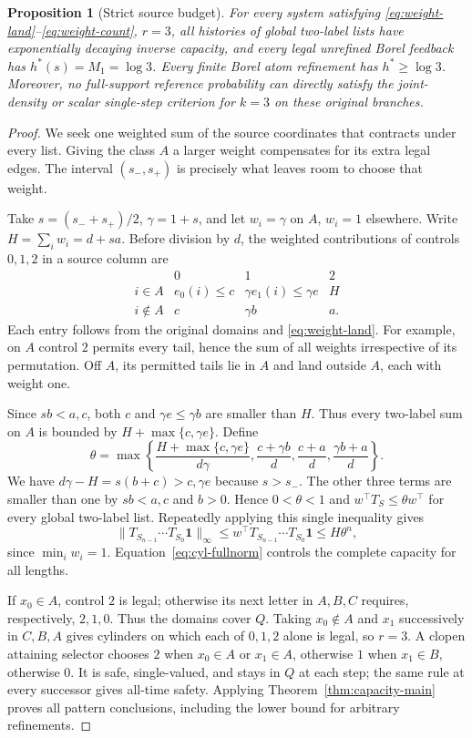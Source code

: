 \documentclass[11pt,reqno]{amsart}
\numberwithin{equation}{section}
\newtheorem{proposition}[theorem]{Proposition}
\theoremstyle{definition}
\theoremstyle{definition}
\newcommand{\one}{\mathbf 1}
\begin{document}
\begin{proposition}[Strict source budget]\label{thm:source-weight}
For every system satisfying \eqref{eq:weight-land}--\eqref{eq:weight-count},
$r=3$, all histories of global two-label lists have exponentially
decaying inverse capacity, and every legal unrefined Borel feedback
has $h^*(s)=M_1=\log3$. Every finite Borel atom refinement has
$h^*\ge\log3$. Moreover, no full-support reference probability
can directly satisfy the joint-density or scalar single-step
criterion for $k=3$ on these original branches.
\end{proposition}
\begin{proof}
We seek one weighted sum of the source coordinates that contracts
under every list. Giving the class $A$ a larger weight compensates
for its extra legal edges. The interval $(s_-,s_+)$ is precisely
what leaves room to choose that weight.

Take $s=(s_-+s_+)/2$, $\gamma=1+s$, and let $w_i=\gamma$
on $A$, $w_i=1$ elsewhere. Write $H=\sum_iw_i=d+sa$.
Before division by $d$, the weighted contributions of controls
$0,1,2$ in a source column are
\[
\begin{array}{c|ccc}
 &0&1&2\\\hline
 i\in A&e_0(i)\le c&\gamma e_1(i)\le\gamma e&H\\
 i\notin A&c&\gamma b&a.
\end{array}
\]
Each entry follows from the original domains and
\eqref{eq:weight-land}. For example, on $A$ control $2$ permits
every tail, hence the sum of all weights irrespective of its
permutation. Off $A$, its permitted tails lie in $A$ and land
outside $A$, each with weight one.

Since $sb<a,c$, both $c$ and $\gamma e\le\gamma b$ are smaller
than $H$. Thus every two-label sum on $A$ is bounded by
$H+\max\{c,\gamma e\}$. Define
\[
 \theta=\max\left\{
 \frac{H+\max\{c,\gamma e\}}{d\gamma},
 \frac{c+\gamma b}{d},\frac{c+a}{d},\frac{\gamma b+a}{d}
 \right\}.
\]
We have $d\gamma-H=s(b+c)>c,\gamma e$ because $s>s_-$.
The other three terms are smaller than one by $sb<a,c$ and
$b>0$. Hence $0<\theta<1$ and
$w^\top T_S\le\theta w^\top$ for every global two-label list.
Repeatedly applying this single inequality gives
\[
 \|T_{S_{n-1}}\cdots T_{S_0}\one\|_\infty
 \le w^\top T_{S_{n-1}}\cdots T_{S_0}\one
 \le H\theta^n,
\]
since $\min_iw_i=1$. Equation~\eqref{eq:cyl-fullnorm} controls
the complete capacity for all lengths.

If $x_0\in A$, control $2$ is legal; otherwise its next letter
in $A,B,C$ requires, respectively, $2,1,0$. Thus the domains
cover $Q$. Taking $x_0\notin A$ and $x_1$ successively in
$C,B,A$ gives cylinders on which each of $0,1,2$ alone is legal,
so $r=3$. A clopen attaining selector chooses $2$ when $x_0\in A$
or $x_1\in A$, otherwise $1$ when $x_1\in B$, otherwise $0$.
It is safe, single-valued, and stays in $Q$ at each step; the same
rule at every successor gives all-time safety. Applying
Theorem~\ref{thm:capacity-main} proves all pattern conclusions,
including the lower bound for arbitrary refinements.


\end{proof}
\end{document}
